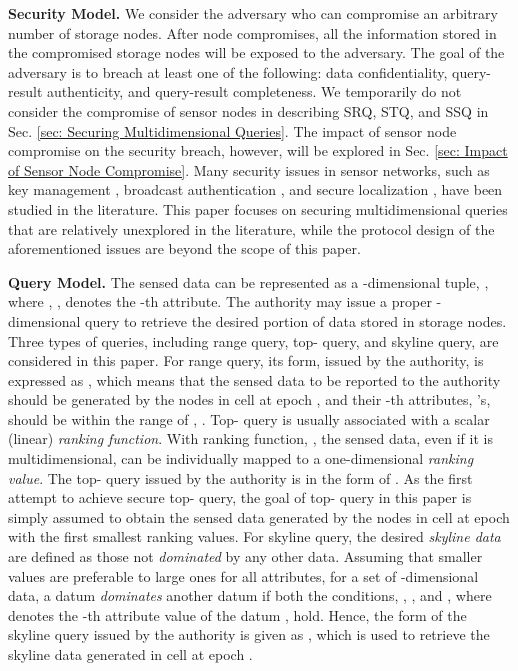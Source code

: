 \documentclass[conference]{IEEEtran}
\begin{document}
\textbf{Security Model.}
We consider the adversary who can compromise an arbitrary number of storage nodes. After node compromises, all the information stored in the compromised storage nodes will be exposed to the adversary. The goal of the adversary is to breach at least one of the following: data confidentiality, query-result authenticity, and query-result completeness. We temporarily do not consider the compromise of sensor nodes in describing SRQ, STQ, and SSQ in Sec. \ref{sec: Securing Multidimensional Queries}. The impact of sensor node compromise on the security breach, however, will be explored in Sec. \ref{sec: Impact of Sensor Node Compromise}. Many security issues in sensor networks, such as key management \cite{cps03,eg02,ylk09}, broadcast authentication \cite{pswct01,ln04}, and secure localization \cite{lnd05,zlfw06}, have been studied in the literature. This paper focuses on securing multidimensional queries that are relatively unexplored in the literature, while the protocol design of the aforementioned issues are beyond the scope of this paper.

\textbf{Query Model.}
The sensed data can be represented as a -dimensional tuple, , where , , denotes the -th attribute. The authority may issue a proper -dimensional query to retrieve the desired portion of data stored in storage nodes. Three types of queries, including range query, top- query, and skyline query, are considered in this paper. For range query, its form, issued by the authority, is expressed as , which means that the sensed data to be reported to the authority should be generated by the nodes in cell  at epoch , and their -th attributes, 's, should be within the range of , . Top- query is usually associated with a scalar (linear) \emph{ranking function}. With ranking function, , the sensed data, even if it is multidimensional, can be individually mapped to a one-dimensional \emph{ranking value}. The top- query issued by the authority is in the form of . As the first attempt to achieve secure top- query, the goal of top- query in this paper is simply assumed to obtain the sensed data generated by the nodes in cell  at epoch  with the first  smallest ranking values. For skyline query, the desired \emph{skyline data} are defined as those not \emph{dominated} by any other data. Assuming that smaller values are preferable to large ones for all attributes, for a set of -dimensional data, a datum  \emph{dominates} another datum  if both the conditions, , , and , where  denotes the -th attribute value of the datum , hold. Hence, the form of the skyline query issued by the authority is given as , which is used to retrieve the skyline data generated in cell  at epoch .
\end{document}
